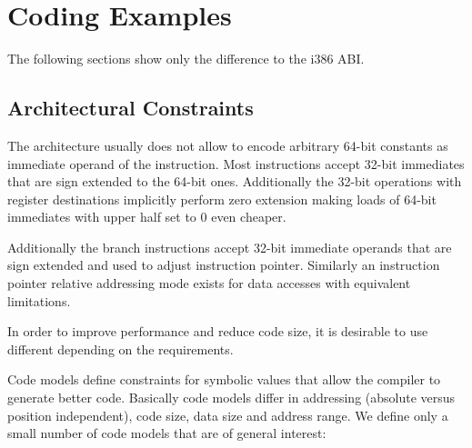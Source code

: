 \section{Coding Examples}

The following sections show only the difference to the i386 ABI.

\subsection{Architectural Constraints}

The \xARCH architecture usually does not allow to encode arbitrary
64-bit constants as immediate operand of the instruction.  Most
instructions accept 32-bit immediates that are sign extended to the
64-bit ones.  Additionally the 32-bit operations with register
destinations implicitly perform zero extension making loads of 64-bit
immediates with upper half set to 0 even cheaper.

Additionally the branch instructions accept 32-bit immediate operands
that are sign extended and used to adjust instruction pointer.
Similarly an instruction pointer relative addressing mode exists for
data accesses with equivalent limitations.

In order to improve performance and reduce code size, it is desirable
to use different  depending on the
requirements.

Code models define constraints for symbolic values that allow the
compiler to generate better code.  Basically code models differ in
addressing (absolute versus position independent), code size, data
size and address range.  We define only a small number of code models
that are of general interest:

